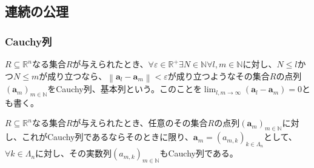 \documentclass[dvipdfmx]{jsarticle}
\begin{document}
\subsection{連続の公理}%
\subsubsection{Cauchy列}%
\begin{dfn}
$R \subseteq \mathbb{R}^{n}$なる集合$R$が与えられたとき、$\forall\varepsilon \in \mathbb{R}^{+}\exists N \in \mathbb{N}\forall l,m \in \mathbb{N}$に対し、$N \leq l$かつ$N \leq m$が成り立つなら、$\left\| \mathbf{a}_{l} - \mathbf{a}_{m} \right\| < \varepsilon$が成り立つようなその集合$R$の点列$\left( \mathbf{a}_{m} \right)_{m \in \mathbb{N}}$をCauchy列、基本列という。このことを$\lim_{l,m \rightarrow \infty}\left( \mathbf{a}_{l} - \mathbf{a}_{m} \right) = 0$とも書く。
\end{dfn}
\begin{thm}\label{4.1.5.1}
$R \subseteq \mathbb{R}^{n}$なる集合$R$が与えられたとき、任意のその集合$R$の点列$\left( \mathbf{a}_{m} \right)_{m \in \mathbb{N}}$に対し、これがCauchy列であるならそのときに限り、$\mathbf{a}_{m} = \left( a_{m,k} \right)_{k \in \varLambda_{n}}$として、$\forall k \in \varLambda_{n}$に対し、その実数列$\left( a_{m,k} \right)_{m \in \mathbb{N}}$もCauchy列である。
\end{thm}
\end{document}
